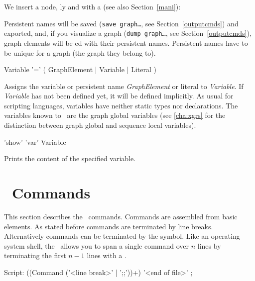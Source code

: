 \begin{example}
\label{persistentex}
We insert a node, ly and with a  (see also Section~\ref{mani}):
\end{example}
\begin{note}
Persistent names will be saved (\texttt{save graph\dots}, see Section~\ref{outputcmds}) and exported,
and, if you visualize a graph (\texttt{dump graph\dots}, see Section~\ref{outputcmds}),
graph elements will be ed with their persistent names.
Persistent names have to be unique for a graph (the graph they belong to).
\end{note}

\begin{rail}
  Variable '=' ( GraphElement | Variable | Literal )
\end{rail}
Assigns the variable or persistent name \emph{GraphElement} or literal to \emph{Variable}.
If \emph{Variable} has not been defined yet, it will be defined implicitly.
As usual for scripting languages, variables have neither static types nor declarations.
The variables known to \GrShell\ are the graph global variables (see \ref{cha:xgrs} for the distinction between graph global and sequence local variables).

\begin{rail}
'show' 'var' Variable
\end{rail}
Prints the content of the specified variable.


\section{\GrShell\ Commands}
This section describes the \GrShell\ commands. Commands are assembled from basic elements.
As stated before commands are terminated by line breaks. Alternatively commands can be terminated by the \indexed{\texttt{;;}} symbol.
Like an operating system shell, the \GrShell\ allows you to span a single command over $n$ lines by terminating the first $n-1$ lines with a .
\begin{rail}
  Script: ((Command ('<line break>' | ';;'))+) '<end of file>' ;
\end{rail}


